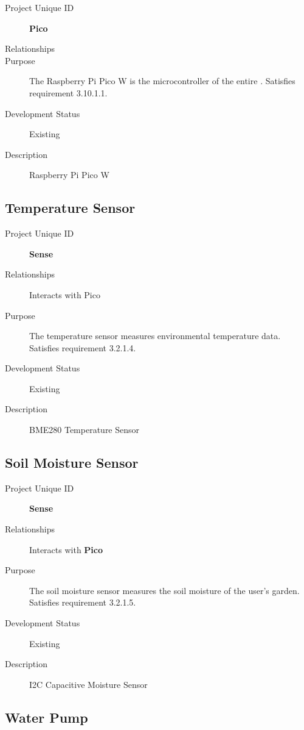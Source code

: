\begin{description}
    \item[Project Unique ID] \textbf{Pico}
    \item[Relationships] 
    \item[Purpose] The Raspberry Pi Pico W is the microcontroller of the entire \ThisSystem. Satisfies requirement 3.10.1.1.
    \item[Development Status] Existing
    \item[Description] Raspberry Pi Pico W
\end{description}

\subsection{Temperature Sensor}

\begin{description}
    \item[Project Unique ID] \textbf{Sense}
    \item[Relationships] Interacts with Pico
    \item[Purpose] The temperature sensor measures environmental temperature data. Satisfies requirement 3.2.1.4.
    \item[Development Status] Existing
    \item[Description] BME280 Temperature Sensor
\end{description}

\subsection{Soil Moisture Sensor}

\begin{description}
    \item[Project Unique ID] \textbf{Sense}
    \item[Relationships] Interacts with \textbf{Pico}
    \item[Purpose] The soil moisture sensor measures the soil moisture of the user's garden. Satisfies requirement 3.2.1.5.
    \item[Development Status] Existing
    \item[Description] I2C Capacitive Moisture Sensor
\end{description}

\subsection{Water Pump}

